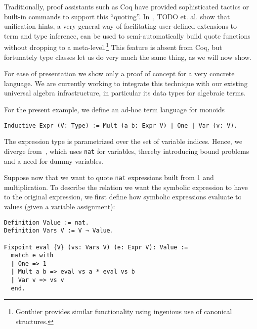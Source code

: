\documentclass[a4paper,10pt,runningheads]{llncs}
\begin{document}
Traditionally, proof assistants such as Coq have provided sophisticated tactics or built-in commands to support this ``quoting''. In~\cite{Hints}, TODO et. al. show that unification hints, a very general way of facilitating user-defined extensions to term and type inference, can be used to semi-automatically build quote functions without dropping to a meta-level.\footnote{Gonthier provides similar functionality using ingenious use of canonical structures.} This feature is absent from Coq, but fortunately type classes let us do very much the same thing, as we will now show.

For ease of presentation we show only a proof of concept for a very concrete language. We are currently working to integrate this technique with our existing universal algebra infrastructure, in particular its data types for algebraic terms.%

For the present example, we define an ad-hoc term language for monoids
\begin{lstlisting}
Inductive Expr (V: Type) := Mult (a b: Expr V) | One | Var (v: V).
\end{lstlisting}
The expression type is parametrized over the set of variable indices. Hence, we diverge from~\cite{Hints}, which uses \lstinline|nat| for variables, thereby introducing bound problems and a need for dummy variables.

Suppose now that we want to quote \lstinline|nat| expressions built from 1 and multiplication. To describe the relation we want the symbolic expression to have to the original expression, we first define how symbolic expressions evaluate to values (given a variable assignment):
\begin{lstlisting}
Definition Value := nat.
Definition Vars V := V → Value.

Fixpoint eval {V} (vs: Vars V) (e: Expr V): Value :=
  match e with
  | One => 1
  | Mult a b => eval vs a * eval vs b
  | Var v => vs v
  end.
\end{lstlisting}

\end{document}
